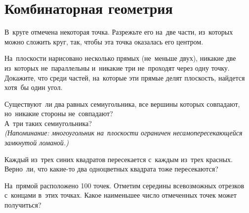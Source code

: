 

\section*{Комбинаторная геометрия}


\begin{problems}

\item
В~круге отмечена некоторая точка.
Разрежьте его на~две части, из~которых можно сложить круг, так, чтобы эта точка
оказалась его центром.

\item
На~плоскости нарисовано несколько прямых (не~меньше двух), никакие две
из~которых не~параллельны и~никакие три не~проходят через одну точку.
Докажите, что среди частей, на~которые эти прямые делят плоскость, найдется
хотя~бы один угол.

\item
\sbp
Существуют~ли два равных семиугольника, все вершины которых совпадают,
но~никакие стороны не~совпадают?
\\
\sbp
А~три таких семиугольника?
\\
\emph{(Напоминание: многоугольник на~плоскости ограничен несамопересекающейся
замкнутой ломаной.)}

\item
Каждый из~трех синих квадратов пересекается с~каждым из~трех красных.
Верно~ли, что какие-то два одноцветных квадрата тоже пересекаются?

\item
На~прямой расположено 100 точек.
Отметим середины всевозможных отрезков с~концами в~этих точках.
Какое наименьшее число отмеченных точек может получиться?

\end{problems}

